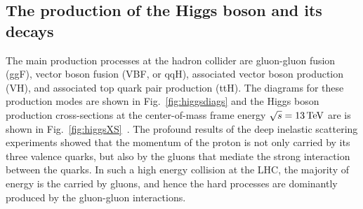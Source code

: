 \subsection{The production of the Higgs boson and its decays}
The main production processes at the hadron collider are gluon-gluon fusion (ggF), vector boson fusion (VBF, or qqH), associated vector boson production (VH), and associated top quark pair production (ttH). The diagrams for these production modes are shown in Fig.~\ref{fig:higgsdiags} and the Higgs boson production cross-sections at the center-of-mass frame energy $\sqrt{s}=13\,\text{Te\hspace{-.08em}V}$ are is shown in Fig.~\ref{fig:higgsXS}~\cite{LHCHXSWG}. 
The profound results of the deep inelastic scattering experiments showed that the momentum of the proton is not only carried by its three valence quarks, but also by the gluons that mediate the strong interaction between the quarks. In such a high energy collision at the LHC, the majority of energy is the carried by gluons, and hence the hard processes are dominantly produced by the gluon-gluon interactions.

